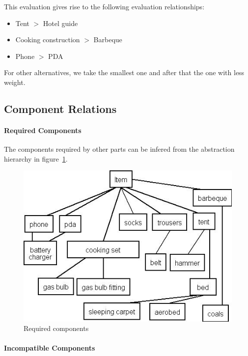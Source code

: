 \documentclass[a4paper,11pt]{article}
\begin{document}
This evaluation gives rise to the following evaluation
relationships:

\begin{itemize}
\item Tent $>$ Hotel guide
\item Cooking construction $>$ Barbeque
\item Phone $>$ PDA
\end{itemize}

For other alternatives, we take the smallest one and after
that the one with less weight.


\subsection*{Component Relations}

\paragraph{Required Components}

The components required by other parts can be infered from the abstraction 
hierarchy in figure~\ref{figuur:RequiredComponents}.

\begin{figure}
\begin{center}
\includegraphics{subcomponents.jpg}
\end{center}
\caption{Required components}
\label{figuur:RequiredComponents}
\end{figure}

\paragraph{Incompatible Components}
\end{document}
